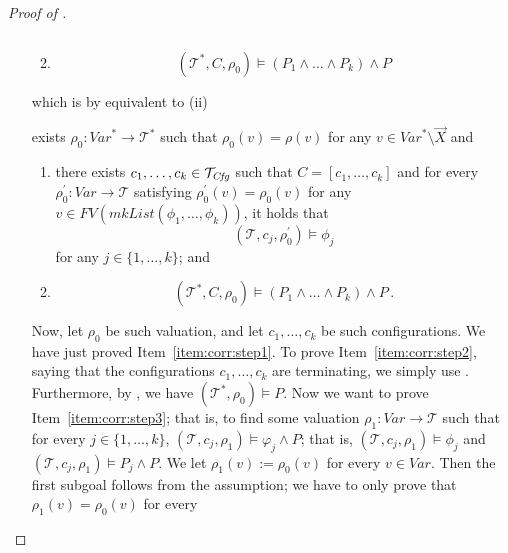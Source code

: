 \begin{proof}[Proof of ]
\begin{enumerate}
\begin{proofenv}
\begin{enumerate}
\begin{equation*}
        \end{equation*}
        \item 
        \begin{equation*}
            (\mathcal{T}^*, C, \rho_0) \vDash (P_1\land \ldots \land P_k) \land P
        \end{equation*}
    \end{enumerate}
    \end{proofenv}
    which is by  equivalent to (ii)
    \begin{proofenv}
    exists $\rho_0 : \mathit{Var}^* \to \mathcal{T}^*$ such that $\rho_0(v) = \rho(v)$ for any $v \in \mathit{Var}^* \setminus \vec{X}$ and
    \begin{enumerate}
        \item there exists $c_1,\ldots,c_k \in \mathcal{T}_{\mathit{Cfg}}$ such that $C = [c_1,\ldots,c_k]$
        and for every $\rho_0^\prime : \mathit{Var} \to \mathcal{T}$ satisfying $\rho_0^\prime(v) = \rho_0(v)$
        for any $v \in \mathit{FV}(\mathit{mkList}(\phi_1, \ldots, \phi_k))$, it holds that
        \begin{equation*}
            (\mathcal{T}, c_j, \rho_0^\prime) \vDash \phi_j
        \end{equation*}
        for any $j \in \{ 1, \ldots, k \}$; and
        \item
        \begin{equation*}
            (\mathcal{T}^*, C, \rho_0) \vDash (P_1 \land \ldots \land P_k) \land P \, .
        \end{equation*}
    \end{enumerate}
    \end{proofenv}
    Now, let $\rho_0$ be such valuation,
    and let $c_1,\ldots,c_k$ be such configurations. We have just proved Item~\ref{item:corr:step1}.
    To prove Item~\ref{item:corr:step2}, saying that the configurations $c_1, \ldots, c_k$ are terminating,
    we simply use .
    Furthermore, by , we have $(\mathcal{T}^*, \rho_0) \vDash P$.
    Now we want to prove Item~\ref{item:corr:step3}; that is, to find some valuation $\rho_1 : \mathit{Var} \to \mathcal{T}$
    such that for every $j \in \{ 1, \ldots, k \}$,
    $(\mathcal{T}, c_j, \rho_1) \vDash \varphi_j \land P$;
    that is, $(\mathcal{T}, c_j, \rho_1) \vDash \phi_j$ and $(\mathcal{T}, c_j, \rho_1) \vDash P_j \land P$.
    We let $\rho_1(v) := \rho_0(v)$ for every $v \in \mathit{Var}$.
    Then the first subgoal follows from the assumption; we have to only prove that $\rho_1(v) = \rho_0(v)$ for every

\end{enumerate}
\end{proof}
